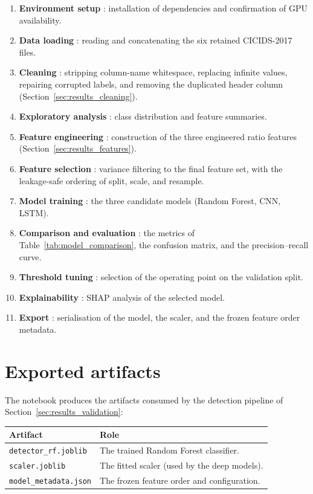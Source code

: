 \begin{enumerate}
  \item \textbf{Environment setup} : installation of dependencies and confirmation of GPU availability.
  \item \textbf{Data loading} : reading and concatenating the six retained CICIDS-2017 files.
  \item \textbf{Cleaning} : stripping column-name whitespace, replacing infinite values, repairing corrupted labels, and removing the duplicated header column (Section~\ref{sec:results_cleaning}).
  \item \textbf{Exploratory analysis} : class distribution and feature summaries.
  \item \textbf{Feature engineering} : construction of the three engineered ratio features (Section~\ref{sec:results_features}).
  \item \textbf{Feature selection} : variance filtering to the final feature set, with the leakage-safe ordering of split, scale, and resample.
  \item \textbf{Model training} : the three candidate models (Random Forest, CNN, LSTM).
  \item \textbf{Comparison and evaluation} : the metrics of Table~\ref{tab:model_comparison}, the confusion matrix, and the precision--recall curve.
  \item \textbf{Threshold tuning} : selection of the operating point on the validation split.
  \item \textbf{Explainability} : SHAP analysis of the selected model.
  \item \textbf{Export} : serialisation of the model, the scaler, and the frozen feature order metadata.
\end{enumerate}

\section{Exported artifacts}
\label{app:notebook_artifacts}

The notebook produces the artifacts consumed by the detection pipeline of Section~\ref{sec:results_validation}:

\begin{center}
\begin{tabular}{ll}
  \toprule
  \textbf{Artifact} & \textbf{Role} \\
  \midrule
  \texttt{detector\_rf.joblib}   & The trained Random Forest classifier. \\
  \texttt{scaler.joblib}         & The fitted scaler (used by the deep models). \\
  \texttt{model\_metadata.json}  & The frozen feature order and configuration. \\
  \bottomrule
\end{tabular}
\end{center}

